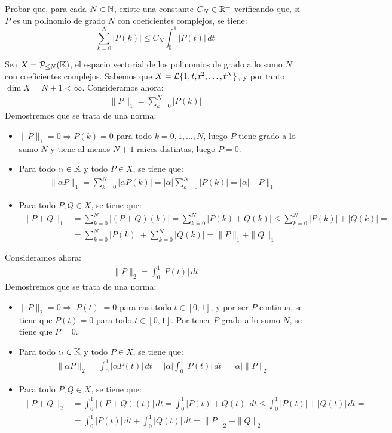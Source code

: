 \begin{ejercicio}
Probar que, para cada $N \in \mathbb{N}$, existe una constante $C_N \in \mathbb{R}^+$ verificando que, si $P$ es un polinomio de grado $N$ con coeficientes complejos, se tiene:
\[
\sum_{k=0}^N |P(k)| \leq C_N \int_{0}^1 |P(t)|\,dt
\]

    Sea $X = \mathcal{P}_{\leq N}(\mathbb{K})$, el espacio vectorial de los polinomios de grado a lo sumo $N$ con coeficientes complejos. Sabemos que $X=\mathcal{L}\{1, t, t^2, \ldots, t^N\}$, y por tanto $\dim X = N+1 < \infty$. Consideramos ahora:
    \begin{align*}
        \|P\|_1 = \sum_{k=0}^N |P(k)|
    \end{align*}
    Demostremos que se trata de una norma:
    \begin{itemize}
        \item $\|P\|_1 = 0 \Longrightarrow P(k) = 0$ para todo $k=0, 1, \ldots, N$, luego $P$ tiene grado a lo sumo $N$ y tiene al menos $N+1$ raíces distintas, luego $P=0$. 
        \item Para todo $\alpha \in \mathbb{K}$ y todo $P \in X$, se tiene que:
        \begin{align*}
            \|\alpha P\|_1 = \sum_{k=0}^N |\alpha P(k)| = |\alpha| \sum_{k=0}^N |P(k)| = |\alpha| \|P\|_1
        \end{align*}
        \item Para todo $P, Q \in X$, se tiene que:
        \begin{align*}
            \|P + Q\|_1 &= \sum_{k=0}^N |(P + Q)(k)| = \sum_{k=0}^N |P(k) + Q(k)| \leq \sum_{k=0}^N |P(k)| + |Q(k)| =\\&= \sum_{k=0}^N |P(k)| + \sum_{k=0}^N |Q(k)| = \|P\|_1 + \|Q\|_1
        \end{align*}
    \end{itemize}

    Consideramos ahora:
    \begin{align*}
        \|P\|_2 = \int_{0}^1 |P(t)|\,dt
    \end{align*}
    Demostremos que se trata de una norma:
    \begin{itemize}
        \item $\|P\|_2 = 0 \Longrightarrow |P(t)| = 0$ para casi todo $t \in [0, 1]$, y por ser $P$ continua, se tiene que $P(t) = 0$ para todo $t \in [0, 1]$. Por tener $P$ grado a lo sumo $N$, se tiene que $P=0$.
        \item Para todo $\alpha \in \mathbb{K}$ y todo $P \in X$, se tiene que:
        \begin{align*}
            \|\alpha P\|_2 = \int_{0}^1 |\alpha P(t)|\,dt = |\alpha| \int_{0}^1 |P(t)|\,dt = |\alpha| \|P\|_2
        \end{align*}
        \item Para todo $P, Q \in X$, se tiene que:
        \begin{align*}
            \|P + Q\|_2 &= \int_{0}^1 |(P + Q)(t)|\,dt = \int_{0}^1 |P(t) + Q(t)|\,dt \leq \int_{0}^1 |P(t)| + |Q(t)|\,dt =\\&= \int_{0}^1 |P(t)|\,dt + \int_{0}^1 |Q(t)|\,dt = \|P\|_2 + \|Q\|_2
        \end{align*}
    \end{itemize}


\end{ejercicio}
